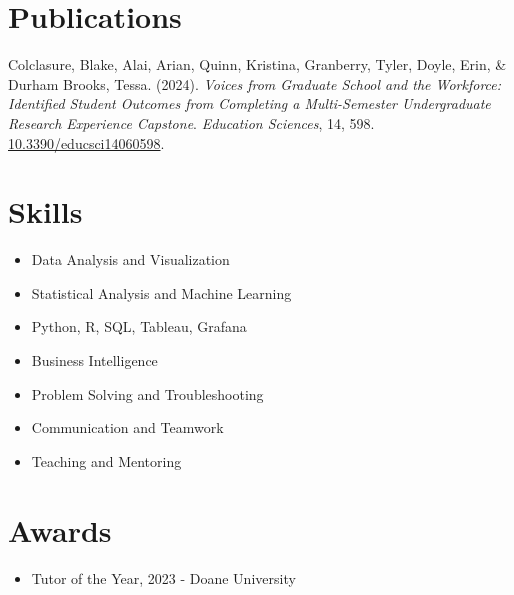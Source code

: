 \documentclass[a4paper,10pt]{article}
\begin{document}
\section*{Publications}

Colclasure, Blake, Alai, Arian, Quinn, Kristina, Granberry, Tyler, Doyle, Erin, \& Durham Brooks, Tessa. (2024). \textit{Voices from Graduate School and the Workforce: Identified Student Outcomes from Completing a Multi-Semester Undergraduate Research Experience Capstone}. \textit{Education Sciences}, 14, 598. \href{https://doi.org/10.3390/educsci14060598}{10.3390/educsci14060598}.


\section*{Skills}
\begin{itemize}[noitemsep, topsep=0pt]
    \item Data Analysis and Visualization
    \item Statistical Analysis and Machine Learning
    \item Python, R, SQL, Tableau, Grafana
    \item Business Intelligence
    \item Problem Solving and Troubleshooting
    \item Communication and Teamwork
    \item Teaching and Mentoring
\end{itemize}

\section*{Awards}
\begin{itemize}[noitemsep, topsep=0pt]
    \item Tutor of the Year, 2023 - Doane University
\end{itemize}
\end{document}
